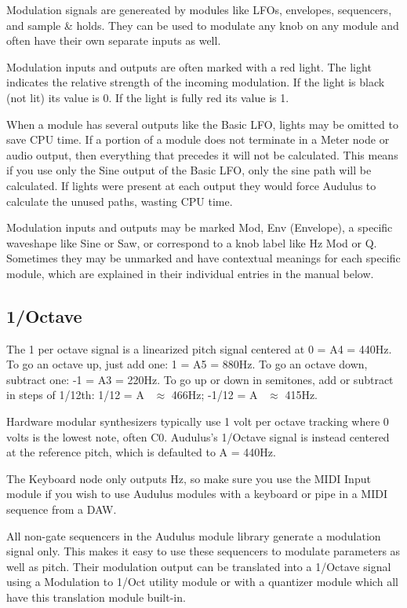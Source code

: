 \documentclass[11pt]{book}
\begin{document}
Modulation signals are genereated by modules like LFOs, envelopes, sequencers, and sample \& holds. They can be used to modulate any knob on any module and often have their own separate inputs as well.

Modulation inputs and outputs are often marked with a red light. The light indicates the relative strength of the incoming modulation. If the light is black (not lit) its value is 0. If the light is fully red its value is 1.

When a module has several outputs like the Basic LFO, lights may be omitted to save CPU time. If a portion of a module does not terminate in a Meter node or audio output, then everything that precedes it will not be calculated. This means if you use only the Sine output of the Basic LFO, only the sine path will be calculated. If lights were present at each output they would force Audulus to calculate the unused paths, wasting CPU time.

Modulation inputs and outputs may be marked Mod, Env (Envelope), a specific waveshape like Sine or Saw, or correspond to a knob label like Hz Mod or Q. Sometimes they may be unmarked and have contextual meanings for each specific module, which are explained in their individual entries in the manual below.

\subsection{1/Octave}

The 1 per octave signal is a linearized pitch signal centered at 0 = A4 = 440Hz. To go an octave up, just add one: 1 = A5 = 880Hz. To go an octave down, subtract one: -1 = A3 = 220Hz. To go up or down in semitones, add or subtract in steps of 1/12th: 1/12 = A \ $\approx$ 466Hz; -1/12 = A \ $\approx$ 415Hz. 

Hardware modular synthesizers typically use 1 volt per octave tracking where 0 volts is the lowest note, often C0. Audulus's 1/Octave signal is instead centered at the reference pitch, which is defaulted to A = 440Hz. 

The Keyboard node only outputs Hz, so make sure you use the MIDI Input module if you wish to use Audulus modules with a keyboard or pipe in a MIDI sequence from a DAW.

All non-gate sequencers in the Audulus module library generate a modulation signal only. This makes it easy to use these sequencers to modulate parameters as well as pitch. Their modulation output can be translated into a 1/Octave signal using a Modulation to 1/Oct utility module or with a quantizer module which all have this translation module built-in.
\end{document}

